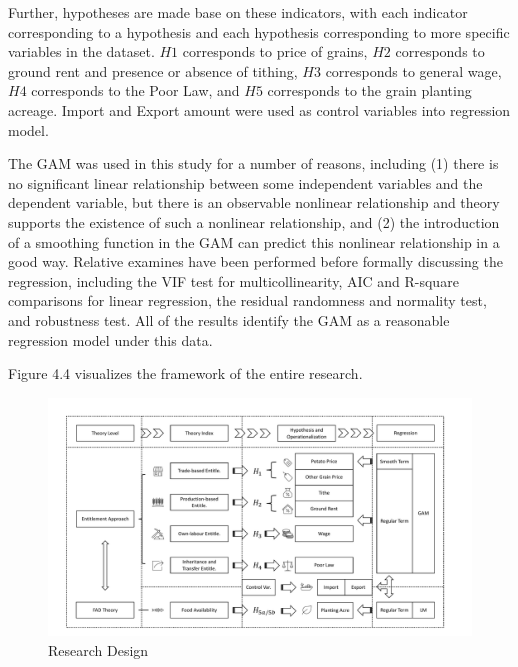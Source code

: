 Further, hypotheses are made base on these indicators, with each indicator corresponding to a hypothesis and each hypothesis corresponding to more specific variables in the dataset. $H1$ corresponds to price of grains, $H2$ corresponds to ground rent and presence or absence of tithing, $H3$ corresponds to general wage, $H4$ corresponds to the Poor Law, and $H5$ corresponds to the grain planting acreage. Import and Export amount were used as control variables into regression model.

The GAM was used in this study for a number of reasons, including (1) there is no significant linear relationship between some independent variables and the dependent variable, but there is an observable nonlinear relationship and theory supports the existence of such a nonlinear relationship, and (2) the introduction of a smoothing function in the GAM can predict this nonlinear relationship in a good way. Relative examines have been performed before formally discussing the regression, including the VIF test for multicollinearity, AIC and R-square comparisons for linear regression, the residual randomness and normality test, and robustness test. All of the results identify the GAM as a reasonable regression model under this data.

Figure 4.4 visualizes the framework of the entire research.

\begin{landscape}
    \begin{figure}[h]
        \centering
        \caption{Research Design}
        \includegraphics[width=1.5\textheight]{../03_outputs/Framework.pdf}
    \end{figure}
\end{landscape}
